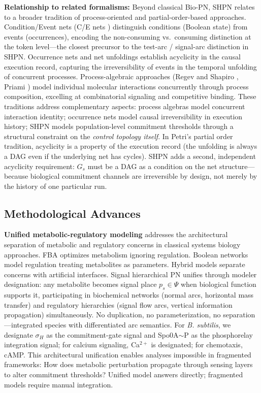\documentclass[10pt,letterpaper]{article}
\begin{document}
\textbf{Relationship to related formalisms:} Beyond classical Bio-PN, SHPN relates to a broader tradition of process-oriented and partial-order-based approaches. Condition/Event nets (C/E nets \cite{rozenberg1998}) distinguish conditions (Boolean state) from events (occurrences), encoding the non-consuming vs.~consuming distinction at the token level---the closest precursor to the test-arc / signal-arc distinction in SHPN. Occurrence nets and net unfoldings \cite{nielsen1981,winskel1987} establish acyclicity in the causal execution record, capturing the irreversibility of events in the temporal unfolding of concurrent processes. Process-algebraic approaches (Regev and Shapiro \cite{regev2002}, Priami \cite{priami2005}) model individual molecular interactions concurrently through process composition, excelling at combinatorial signaling and competitive binding. These traditions address complementary aspects: process algebras model concurrent interaction identity; occurrence nets model causal irreversibility in execution history; SHPN models population-level commitment thresholds through a structural constraint on the \textit{control topology itself}. In Petri's partial order tradition, acyclicity is a property of the execution record (the unfolding is always a DAG even if the underlying net has cycles). SHPN adds a second, independent acyclicity requirement: $G_s$ must be a DAG as a condition on the net structure---because biological commitment channels are irreversible by design, not merely by the history of one particular run.

\subsection{Methodological Advances}

\textbf{Unified metabolic-regulatory modeling} addresses the architectural separation of metabolic and regulatory concerns in classical systems biology approaches. FBA optimizes metabolism ignoring regulation. Boolean networks model regulation treating metabolites as parameters. Hybrid models separate concerns with artificial interfaces. Signal hierarchical PN unifies through modeler designation: any metabolite becomes signal place $p_s \in \Psi$ when biological function supports it, participating in biochemical networks (normal arcs, horizontal mass transfer) and regulatory hierarchies (signal flow arcs, vertical information propagation) simultaneously. No duplication, no parameterization, no separation---integrated species with differentiated arc semantics. For \textit{B. subtilis}, we designate $\sigma_H$ as the commitment-gate signal and Spo0A$\sim$P as the phosphorelay integration signal; for calcium signaling, Ca$^{2+}$ is designated; for chemotaxis, cAMP. This architectural unification enables analyses impossible in fragmented frameworks: How does metabolic perturbation propagate through sensing layers to alter commitment thresholds? Unified model answers directly; fragmented models require manual integration.
\end{document}

